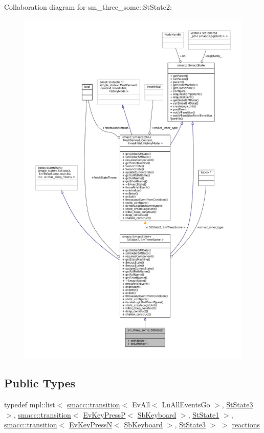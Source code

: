 Collaboration diagram for sm\+\_\+three\+\_\+some\+:\+:St\+State2\+:
\nopagebreak
\begin{figure}[H]
\begin{center}
\leavevmode
\includegraphics[width=350pt]{structsm__three__some_1_1StState2__coll__graph}
\end{center}
\end{figure}
\subsection*{Public Types}
\begin{DoxyCompactItemize}
\item 
typedef mpl\+::list$<$ \hyperlink{classsmacc_1_1transition}{smacc\+::transition}$<$ Ev\+All$<$ Lu\+All\+Events\+Go $>$, \hyperlink{structsm__three__some_1_1StState3}{St\+State3} $>$, \hyperlink{classsmacc_1_1transition}{smacc\+::transition}$<$ \hyperlink{structsm__three__some_1_1EvKeyPressP}{Ev\+Key\+PressP}$<$ \hyperlink{classsm__three__some_1_1SbKeyboard}{Sb\+Keyboard} $>$, \hyperlink{structsm__three__some_1_1StState1}{St\+State1} $>$, \hyperlink{classsmacc_1_1transition}{smacc\+::transition}$<$ \hyperlink{structsm__three__some_1_1EvKeyPressN}{Ev\+Key\+PressN}$<$ \hyperlink{classsm__three__some_1_1SbKeyboard}{Sb\+Keyboard} $>$, \hyperlink{structsm__three__some_1_1StState3}{St\+State3} $>$ $>$ \hyperlink{structsm__three__some_1_1StState2_a9627f8a90cbf6f192b892e29a1280dd2}{reactions}
\end{DoxyCompactItemize}
